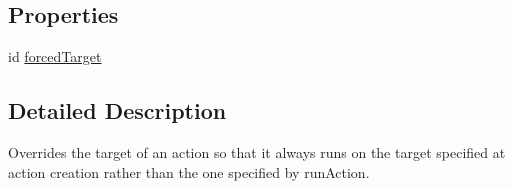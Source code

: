 \subsection*{Properties}
\begin{DoxyCompactItemize}
\item 
id \hyperlink{interface_c_c_targeted_action_ab58161c8edf18cb22ce1077e949f5c8e}{forced\-Target}
\end{DoxyCompactItemize}


\subsection{Detailed Description}
Overrides the target of an action so that it always runs on the target specified at action creation rather than the one specified by run\-Action. 

